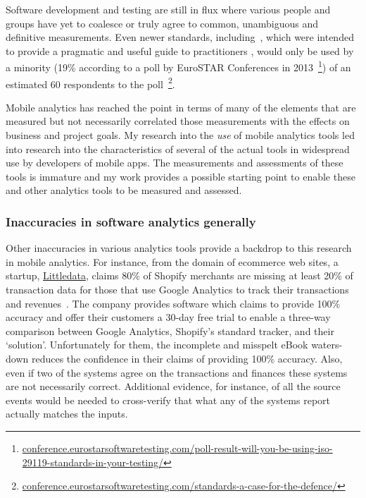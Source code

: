 Software development and testing are still in flux where various people and groups have yet to coalesce or truly agree to common, unambiguous and definitive measurements. Even newer standards, including~, which were intended to provide a pragmatic and useful guide to practitioners , would only be used by a minority (19\% according to a poll by EuroSTAR Conferences in 2013~\footnote{\href{https://conference.eurostarsoftwaretesting.com/poll-result-will-you-be-using-iso-29119-standards-in-your-testing/}{conference.eurostarsoftwaretesting.com/poll-result-will-you-be-using-iso-29119-standards-in-your-testing/}}) of an estimated 60 respondents to the poll~\footnote{\href{https://conference.eurostarsoftwaretesting.com/standards-a-case-for-the-defence/}{conference.eurostarsoftwaretesting.com/standards-a-case-for-the-defence/}}.


Mobile analytics has reached the point in terms of many of the elements that are measured but not necessarily correlated those measurements with the effects on business and project goals. My research into the \emph{use} of mobile analytics tools led into research into the characteristics of several of the actual tools in widespread use by developers of mobile apps. The measurements and assessments of these tools is immature and my work provides a possible starting point to enable these and other analytics tools to be measured and assessed.

\subsubsection{Inaccuracies in software analytics generally}
Other inaccuracies in various analytics tools provide a backdrop to this research in mobile analytics. For instance, from the domain of ecommerce web sites, a startup, \href{https://www.littledata.io/}{Littledata}, claims 80\% of Shopify merchants are missing at least 20\% of transaction data for those that use Google Analytics to track their transactions and revenues~. The company provides software which claims to provide 100\% accuracy and offer their customers a 30-day free trial to enable a three-way comparison between Google Analytics, Shopify's standard tracker, and their `solution'. Unfortunately for them, the incomplete and misspelt eBook waters-down reduces the confidence in their claims of providing 100\% accuracy. Also, even if two of the systems agree on the transactions and finances these systems are not necessarily correct. Additional evidence, for instance, of all the source events would be needed to cross-verify that what any of the systems report actually matches the inputs.


